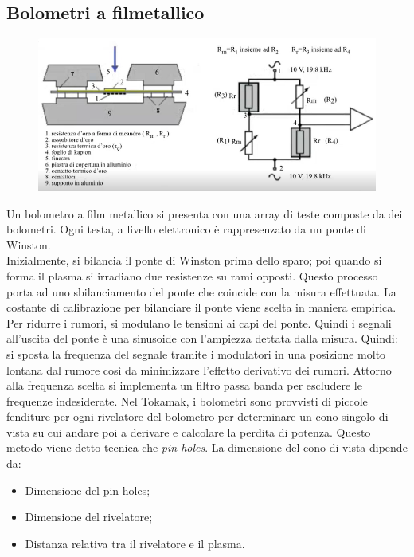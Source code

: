 \documentclass{article}
\begin{document}
\subsection{Bolometri a filmetallico}
\begin{figure}
	\centering
	\includegraphics[scale=0.4]{2022-06-21-16-35-03.png}%
\end{figure}
Un bolometro a film metallico si presenta con una array di teste composte da dei bolometri. Ogni testa, a livello elettronico è rappresenzato da un ponte di Winston.\\
Inizialmente, si bilancia il ponte di Winston prima dello sparo; poi quando si forma il plasma si irradiano due resistenze su rami opposti. Questo processo porta ad uno sbilanciamento del ponte che coincide con la misura effettuata. La costante di calibrazione per bilanciare il ponte viene scelta in maniera empirica.\newline
Per ridurre i rumori, si modulano le tensioni ai capi del ponte. Quindi i segnali all'uscita del ponte è una sinusoide con l'ampiezza dettata dalla misura. Quindi: si sposta la frequenza del segnale tramite i modulatori in una posizione molto lontana dal rumore così da minimizzare l'effetto derivativo dei rumori. Attorno alla frequenza scelta si implementa un filtro passa banda per escludere le frequenze indesiderate.\newline
Nel Tokamak, i bolometri sono provvisti di piccole fenditure per ogni rivelatore del bolometro per determinare un cono singolo di vista su cui andare poi a derivare e calcolare la perdita di potenza. Questo metodo viene detto tecnica che \emph{pin holes}. La dimensione del cono di vista dipende da:\begin{itemize}
	\item Dimensione del pin holes;
	\item Dimensione del rivelatore;
	\item Distanza relativa tra il rivelatore e il plasma.
\end{itemize}
\end{document}
